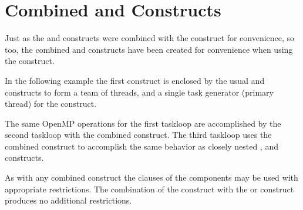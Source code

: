 \section{Combined  and  Constructs}
\label{sec:parallel_masked_taskloop}

Just as the  and  constructs were combined
with the  construct for convenience, so too, the combined
 and 
constructs have been created for convenience when using the
 construct.
  
In the following example the first  construct is enclosed
by the usual  and  constructs to form
a team of threads, and a single task generator (primary thread) for
the  construct.

The same OpenMP operations for the first taskloop are accomplished by the second
taskloop with the  
combined construct. 
The third taskloop uses the combined  
construct to accomplish the same behavior as closely nested ,
and  constructs.

As with any combined construct the clauses of the components may be used
with appropriate restrictions. The combination of the  construct
with the  or  construct produces no additional 
restrictions.

\clearpage

